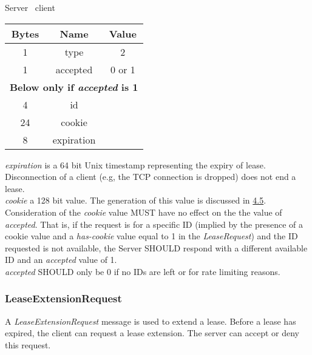 \documentclass{article}
\begin{document}
    \begin{center}
        Server \textrightarrow\ client\\
        \begin{tabular}{|c|c|c|}
            \hline
            \textbf{Bytes} & \textbf{Name} & \textbf{Value} \\
            \hline
            1              & type          & 2              \\
            \hline
            1              & accepted      & 0 or 1         \\
            \hline
            \multicolumn{3}{|c|}{\textbf{Below only if \emph{accepted} is 1} } \\
            \hline
            4              & id            &                \\
            \hline
            24             & cookie        &                \\
            \hline
            8              & expiration    &                \\
            \hline
        \end{tabular}
    \end{center}

    \emph{expiration} is a 64 bit Unix timestamp representing the expiry of lease. Disconnection of a client (e.g,
    the TCP connection is dropped) does not end a lease.\\

    \emph{cookie} a 128 bit value. The generation of this value is discussed in \hyperlink{section.4.5}{4.5}.\\

    Consideration of the \emph{cookie} value MUST have no effect on the the value of \emph{accepted}. That is, if the
    request is for a specific ID (implied by the presence of a cookie value and a \emph{has-cookie} value equal to 1
    in the \emph{LeaseRequest}) and the ID requested is not available, the Server SHOULD respond with a different
    available ID and an \emph{accepted} value of 1.\\

    \emph{accepted} SHOULD only be 0 if no IDs are left or for rate limiting reasons.

    \subsubsection{LeaseExtensionRequest}

    A \emph{LeaseExtensionRequest} message is used to extend a lease. Before a lease has expired, the client can
    request a lease extension. The server can accept or deny this request.
\end{document}
